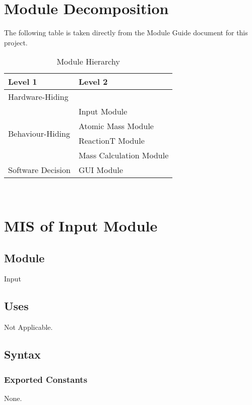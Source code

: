 \documentclass[12pt, titlepage]{article}
\begin{document}
\section{Module Decomposition}

The following table is taken directly from the Module Guide document for this project.

\begin{table}[h!]
\centering
\begin{tabular}{p{} p{}}
\toprule
\textbf{Level 1} & \textbf{Level 2}\\
\midrule

{Hardware-Hiding} & ~ \\
\midrule

\multirow{4}{0.3\textwidth}{Behaviour-Hiding}  &Input Module \\
& Atomic Mass Module\\
&ReactionT Module\\
& Mass Calculation Module\\
\midrule

\multirow{1}{0.3\textwidth}{Software Decision} & GUI Module\\
\bottomrule

\end{tabular}
\caption{Module Hierarchy}
\label{TblMH}
\end{table}


~\newpage

\section{MIS of Input Module} \label{input} 

\subsection{Module}

Input

\subsection{Uses}

Not Applicable.

\subsection{Syntax}

\subsubsection{Exported Constants}
None.
\end{document}
